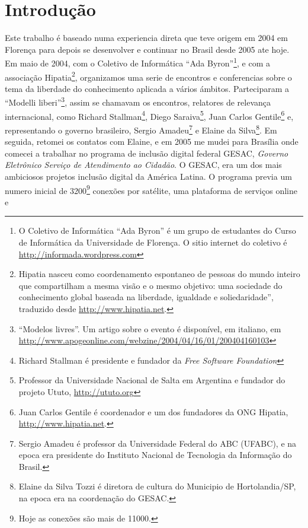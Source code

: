 
\chapter{Introdução}
\label{Capitulo1}


Este trabalho é baseado numa experiencia direta que teve origem em
2004 em Florença para depois se desenvolver e continuar no Brasil
desde 2005 ate hoje. Em maio de 2004, com o Coletivo de Informática
``Ada Byron''\footnote{O Coletivo de Informática ``Ada Byron'' é um
  grupo de estudantes do Curso de Informática da Universidade de
  Florença. O sitio internet do coletivo é
  \url{http://informada.wordpress.com}}, e com a associação
Hipatia\footnote{Hipatia nasceu como coordenamento espontaneo de
  pessoas do mundo inteiro que compartilham a mesma visão e o mesmo
  objetivo: uma sociedade do conhecimento global baseada na liberdade,
  igualdade e soliedaridade'', traduzido desde
  \url{http://www.hipatia.net}.}, organizamos uma serie de encontros e
conferencias sobre o tema da liberdade do conhecimento aplicada a
vários ámbitos. Parteciparam a ``Modelli liberi''\footnote{``Modelos
  livres''. Um artigo sobre o evento é disponível, em italiano, em
  \url{http://www.apogeonline.com/webzine/2004/04/16/01/200404160103}},
assim se chamavam os encontros, relatores de relevança internacional,
como Richard Stallman\footnote{Richard Stallman é presidente e
  fundador da \emph{Free Software Foundation}}, Diego
Saraiva\footnote{Professor da Universidade Nacional de Salta em
  Argentina e fundador do projeto Ututo, \url{http://ututo.org}}, Juan
Carlos Gentile\footnote{Juan Carlos Gentile é coordenador e um dos
  fundadores da ONG Hipatia, \url{http://www.hipatia.net}.} e,
representando o governo brasileiro, Sergio Amadeu\footnote{Sergio
  Amadeu é professor da Universidade Federal do ABC (UFABC), e na
  epoca era presidente do Instituto Nacional de Tecnologia da
  Informação do Brasil.} e Elaine da Silva\footnote{Elaine da Silva
  Tozzi é diretora de cultura do Municipio de Hortolandia/SP, na epoca
  era na coordenação do GESAC.}. Em seguida, retomei os contatos com
Elaine, e em 2005 me mudei para Brasília onde comecei a trabalhar no
programa de inclusão digital federal GESAC, \emph{Governo Eletrônico
  Serviço de Atendimento ao Cidadão}. O GESAC, era um dos mais
ambiciosos projetos inclusão digital da América Latina. O programa
previa um numero inicial de 3200\footnote{Hoje as conexões são mais de
  11000.} conexões por satélite, uma plataforma de serviços online e

